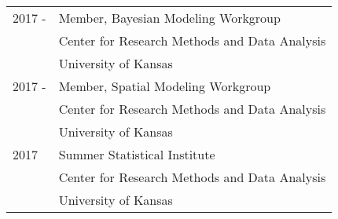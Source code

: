 \documentclass[margin,line,pifont,palatino,courier]{res}
\begin{document}
\begin{resume}
\begin{tabular}{@{}p{0.8in}p{4in}}
  2017 -    & Member, Bayesian Modeling Workgroup\\
            & Center for Research Methods and Data Analysis\\
            & University of Kansas\\
  2017 -    & Member, Spatial Modeling Workgroup\\
            & Center for Research Methods and Data Analysis\\
            & University of Kansas\\
  2017      & Summer Statistical Institute\\
            & Center for Research Methods and Data Analysis\\
            & University of Kansas\\
\end{tabular}








\end{resume}
\end{document}
